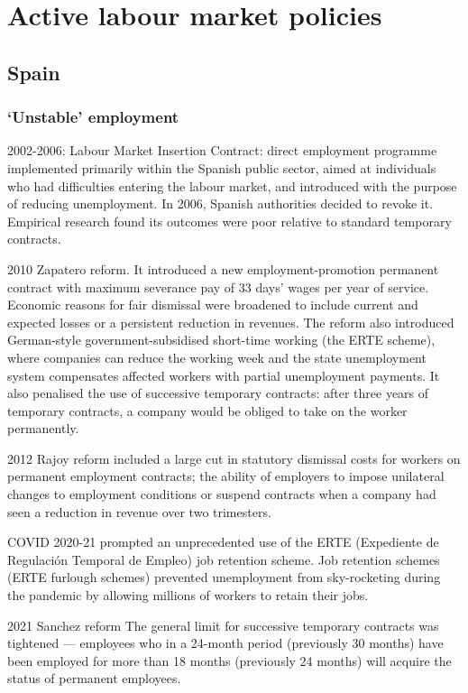 \documentclass[12pt]{article}
\theoremstyle{definition}
\theoremstyle{remark}
\begin{document}
\section{Active labour market policies}

\subsection{Spain}
\subsubsection{`Unstable' employment}
2002-2006: Labour Market Insertion Contract: direct employment programme implemented primarily within the Spanish public sector, aimed at individuals who had difficulties entering the labour market, and introduced with the purpose of reducing unemployment. In 2006, Spanish authorities decided to revoke it. Empirical research found its outcomes were poor relative to standard temporary contracts.

2010 Zapatero reform. It introduced a new employment-promotion permanent contract with maximum severance pay of 33 days' wages per year of service. Economic reasons for fair dismissal were broadened to include current and expected losses or a persistent reduction in revenues.  The reform also introduced German-style government-subsidised short-time working (the ERTE scheme), where companies can reduce the working week and the state unemployment system compensates affected workers with partial unemployment payments. It also penalised the use of successive temporary contracts: after three years of temporary contracts, a company would be obliged to take on the worker permanently.

2012 Rajoy reform included a large cut in statutory dismissal costs for workers on permanent employment contracts; the ability of employers to impose unilateral changes to employment conditions or suspend contracts when a company had seen a reduction in revenue over two trimesters.

COVID 2020-21 prompted an unprecedented use of the ERTE (Expediente de Regulación Temporal de Empleo) job retention scheme. Job retention schemes (ERTE furlough schemes) prevented unemployment from sky-rocketing during the pandemic by allowing millions of workers to retain their jobs.

2021 Sanchez reform The general limit for successive temporary contracts was tightened — employees who in a 24-month period (previously 30 months) have been employed for more than 18 months (previously 24 months) will acquire the status of permanent employees. 
\end{document}
